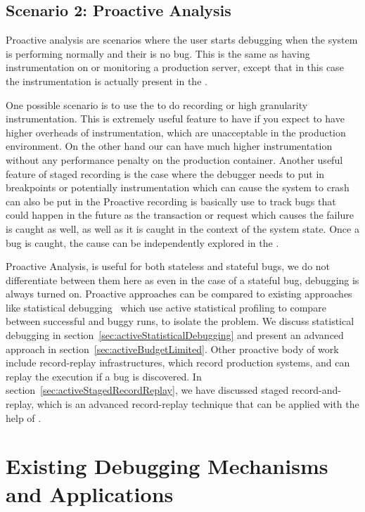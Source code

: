 \subsection{Scenario 2: Proactive Analysis}
\label{sec:activeProactiveAnalysis}

Proactive analysis are scenarios where the user starts debugging when the system is performing normally and their is no bug. This is the same as having instrumentation on or monitoring a production server, except that in this case the instrumentation is actually present in the \debugcontainer.

One possible scenario is to use the \debugcontainer to do recording or high granularity instrumentation. This is extremely useful feature to have if you expect to have higher overheads of instrumentation, which are unacceptable in the production environment. 
On the other hand our \debugcontainer can have much higher instrumentation without any performance penalty on the production container.
Another useful feature of staged recording is the case where the debugger needs to put in breakpoints or potentially instrumentation which can cause the system to crash can also be put in the \debugcontainer
Proactive recording is basically use to track bugs that could happen in the future as the transaction or request which causes the failure is caught as well, as well as it is caught in the context of the system state. 
Once a bug is caught, the cause can be independently explored in the \debugcontainer.

Proactive Analysis, is useful for both stateless and stateful bugs, we do not differentiate between them here as even in the case of a stateful bug, debugging is always turned on. 
Proactive approaches can be compared to existing approaches like statistical debugging~\cite{statisticalDebugging} which use active statistical profiling to compare between successful and buggy runs, to isolate the problem. We discuss statistical debugging in section~\ref{sec:activeStatisticalDebugging} and present an advanced approach in section~\ref{sec:activeBudgetLimited}.
Other proactive body of work include record-replay infrastructures, which record production systems, and can replay the execution if a bug is discovered.
In section~\ref{sec:activeStagedRecordReplay}, we have discussed staged record-and-replay, which is an advanced record-replay technique that can be applied with the help of \parikshan.



\section{Existing Debugging Mechanisms and Applications}
\label{sec:activeExistingTechniques}

